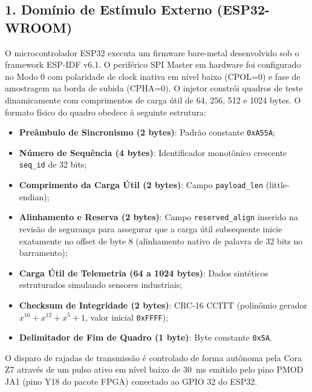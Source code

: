 \documentclass[11pt,a4paper]{article}
\begin{document}
\subsection{1. Domínio de Estímulo Externo (ESP32-WROOM)}
O microcontrolador ESP32 executa um firmware bare-metal desenvolvido sob o framework ESP-IDF v6.1. O periférico SPI Master em hardware foi configurado no Modo 0 com polaridade de clock inativa em nível baixo (CPOL=0) e fase de amostragem na borda de subida (CPHA=0). O injetor constrói quadros de teste dinamicamente com comprimentos de carga útil de 64, 256, 512 e 1024 bytes. O formato físico do quadro obedece à seguinte estrutura:
\begin{itemize}
  \item \textbf{Preâmbulo de Sincronismo (2 bytes)}: Padrão constante \texttt{0xA55A};
  \item \textbf{Número de Sequência (4 bytes)}: Identificador monotônico crescente \texttt{seq\_id} de 32 bits;
  \item \textbf{Comprimento da Carga Útil (2 bytes)}: Campo \texttt{payload\_len} (little-endian);
  \item \textbf{Alinhamento e Reserva (2 bytes)}: Campo \texttt{reserved\_align} inserido na revisão de segurança para assegurar que a carga útil subsequente inicie exatamente no offset de byte 8 (alinhamento nativo de palavra de 32 bits no barramento);
  \item \textbf{Carga Útil de Telemetria (64 a 1024 bytes)}: Dados sintéticos estruturados simulando sensores industriais;
  \item \textbf{Checksum de Integridade (2 bytes)}: CRC-16 CCITT (polinômio gerador $x^{16} + x^{12} + x^5 + 1$, valor inicial \texttt{0xFFFF});
  \item \textbf{Delimitador de Fim de Quadro (1 byte)}: Byte constante \texttt{0x5A}.
\end{itemize}

O disparo de rajadas de transmissão é controlado de forma autônoma pela Cora Z7 através de um pulso ativo em nível baixo de 30~ms emitido pelo pino PMOD JA1 (pino Y18 do pacote FPGA) conectado ao GPIO 32 do ESP32.
\end{document}
